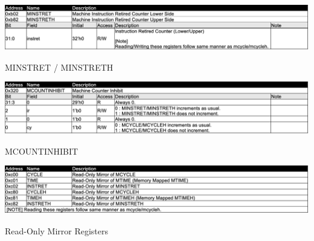 \begin{table}[H]
    \includegraphics[width=1.00\columnwidth]{./Table/MINSTRET.png}
    \caption{MINSTRET / MINSTRETH}
    \label{tb:MINSTRET}
\end{table}

\begin{table}[H]
    \includegraphics[width=1.00\columnwidth]{./Table/MCOUNTINHIBIT.png}
    \caption{MCOUNTINHIBIT}
    \label{tb:MCOUNTINHIBIT}
\end{table}

\begin{table}[H]
    \includegraphics[width=1.00\columnwidth]{./Table/MIRROR.png}
    \caption{Read-Only Mirror Registers}
    \label{tb:MIRROR}
\end{table}





